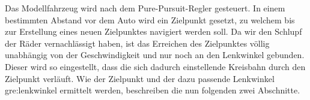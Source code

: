 Das Modellfahrzeug wird nach dem \glqq Pure-Pursuit\grqq-Regler gesteuert. In einem bestimmten Abstand vor dem Auto wird ein Zielpunkt gesetzt, zu welchem bis zur Erstellung eines neuen Zielpunktes navigiert werden soll. Da wir den Schlupf der Räder vernachlässigt haben, ist das Erreichen des Zielpunktes völlig unabhängig von der Geschwindigkeit und nur noch an den Lenkwinkel gebunden. Dieser wird so eingestellt, dass die sich dadurch einstellende Kreisbahn durch den Zielpunkt verläuft. Wie der Zielpunkt und der dazu passende Lenkwinkel \gls{gre:lenkwinkel} ermittelt werden, beschreiben die nun folgenden zwei Abschnitte.
